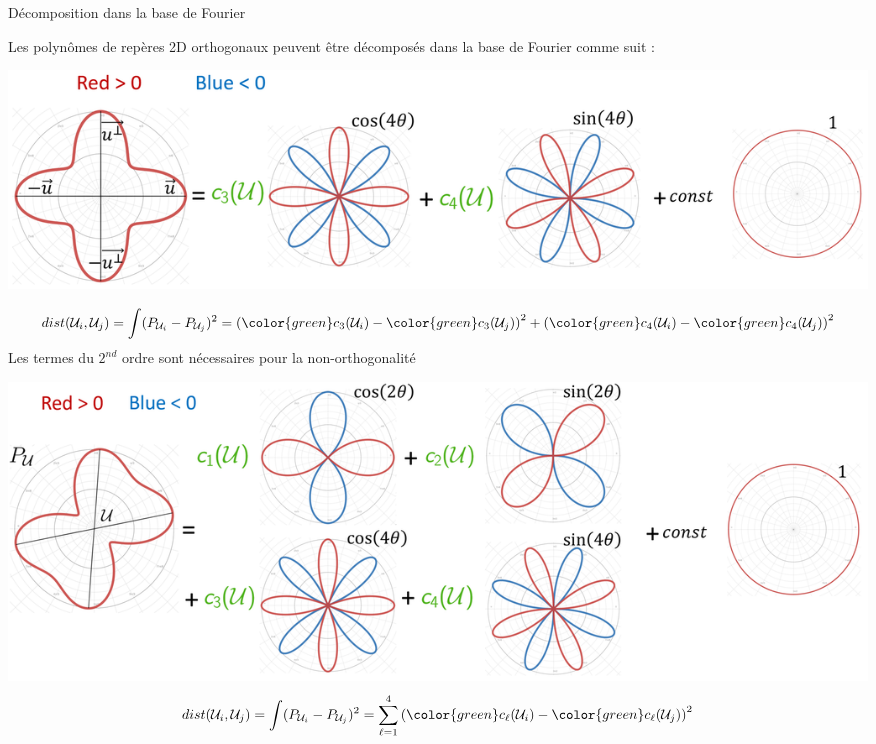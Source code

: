 \documentclass{beamer}
\begin{document}
\begin{frame}{Décomposition dans la base de Fourier}
    \centering
    \begin{overprint}
     \centering
    Les polynômes de repères 2D orthogonaux peuvent être décomposés dans la base de Fourier comme suit :
    
    \vspace*{0.5\baselineskip}
    \includegraphics[width=0.95\linewidth]{img_spm_ff/ortho_decomposition_with_circle.PNG}
    
    $$ dist(\mathcal{U}_i, \mathcal{U}_j) =  \int (P_{\mathcal{U}_i} - P_{\mathcal{U}_j})^2 =  \left({\color{green}c_3(\mathcal{U}_i)} - {\color{green}c_3(\mathcal{U}_j)} \right)^2 
    + \left({\color{green}c_4(\mathcal{U}_i)} - {\color{green}c_4(\mathcal{U}_j)} \right)^2$$
     \centering
    Les termes du $2^{nd}$ ordre sont nécessaires pour la non-orthogonalité
    
    \vspace*{0.5\baselineskip}
    \includegraphics[width=0.95\linewidth]{img_spm_ff/polynome_decomposition_with_circle.PNG}
    $$ dist(\mathcal{U}_i, \mathcal{U}_j) =  \int (P_{\mathcal{U}_i} - P_{\mathcal{U}_j})^2 = \sum_{\ell=1}^4 \left({\color{green}c_\ell(\mathcal{U}_i)} - {\color{green}c_\ell(\mathcal{U}_j)} \right)^2$$
    \end{overprint}
\end{frame} 
\end{document}
